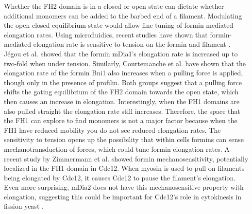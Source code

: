 Whether the FH2 domain is in a closed or open state can dictate whether additional monomers can be added to the barbed end of a filament. Modulating the open-closed equilibrium state would allow fine-tuning of formin-mediated elongation rates. Using microfluidics, recent studies have shown that formin-mediated elongation rate is sensitive to tension on the formin and filament \citep{courtemanche_tension_2013,jegou_formin_2013}. Jégou et al. showed that the formin mDia1's elongation rate is increased up to two-fold when under tension. Similarly, Courtemanche et al. have shown that the elongation rate of the formin Bni1 also increases when a pulling force is applied, though only in the presence of profilin. Both groups suggest that a pulling force shifts the gating equilibrium of the FH2 domain towards the open state, which then causes an increase in elongation. Interestingly, when the FH1 domains are also pulled straight the elongation rate still increases. Therefore, the space that the FH1 can explore to find monomers is not a major factor because when the FH1 have reduced mobility you do not see reduced elongation rates.  The sensitivity to tension opens up the possibility that within cells formins can sense mechanotransduction of forces, which could tune formin elongation rates. A recent study by Zimmermann et al. showed formin mechanosensitivity, potentially localized in the FH1 domain in Cdc12. When myosin is used to pull on filaments being elongated by Cdc12, it causes Cdc12 to pause the filament's elongation. Even more surprising, mDia2 does not have this mechanosensitive property with elongation, suggesting this could be important for Cdc12's role in cytokinesis in fission yeast \citep{zimmermann_mechanoregulated_2017}. 

